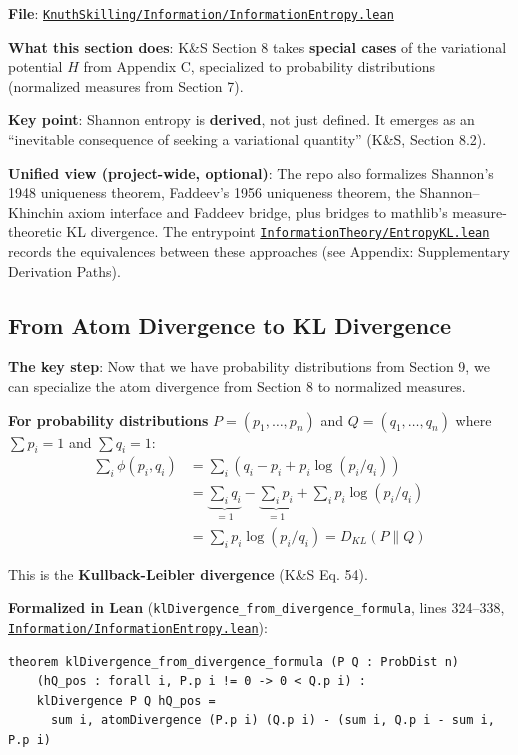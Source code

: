 \documentclass[11pt]{article}
\theoremstyle{definition}
\theoremstyle{remark}
\begin{document}
\textbf{File}: \href{https://github.com/zariuq/ks-foundations-of-inference/blob/main/KnuthSkilling/Information/InformationEntropy.lean}{\texttt{KnuthSkilling/Information/InformationEntropy.lean}}

\textbf{What this section does}: K\&S Section 8 takes \textbf{special cases} of the variational potential $H$ from Appendix C, specialized to probability distributions (normalized measures from Section 7).

\textbf{Key point}: Shannon entropy is \textbf{derived}, not just defined. It emerges as an ``inevitable consequence of seeking a variational quantity'' (K\&S, Section 8.2).

\textbf{Unified view (project-wide, optional)}: The repo also formalizes Shannon's 1948 uniqueness theorem, Faddeev's 1956 uniqueness theorem, the Shannon--Khinchin axiom interface and Faddeev bridge, plus bridges to mathlib's measure-theoretic KL divergence. The entrypoint \href{https://github.com/zariuq/ks-foundations-of-inference/blob/main/InformationTheory/EntropyKL.lean}{\texttt{InformationTheory/EntropyKL.lean}} records the equivalences between these approaches (see Appendix: Supplementary Derivation Paths).

\subsection{From Atom Divergence to KL Divergence}

\textbf{The key step}: Now that we have probability distributions from Section 9, we can specialize the atom divergence from Section 8 to normalized measures.

\textbf{For probability distributions} $P = (p_1, \ldots, p_n)$ and $Q = (q_1, \ldots, q_n)$ where $\sum p_i = 1$ and $\sum q_i = 1$:
\begin{align*}
\sum_i \phi(p_i, q_i) &= \sum_i (q_i - p_i + p_i \log(p_i/q_i)) \\
&= \underbrace{\sum_i q_i}_{=1} - \underbrace{\sum_i p_i}_{=1} + \sum_i p_i \log(p_i/q_i) \\
&= \sum_i p_i \log(p_i/q_i) = D_{KL}(P \| Q)
\end{align*}

This is the \textbf{Kullback-Leibler divergence} (K\&S Eq. 54).

\textbf{Formalized in Lean} (\texttt{klDivergence\_from\_divergence\_formula}, lines 324--338,
\href{https://github.com/zariuq/ks-foundations-of-inference/blob/main/KnuthSkilling/Information/InformationEntropy.lean}{\texttt{Information/InformationEntropy.lean}}):
\begin{lstlisting}
theorem klDivergence_from_divergence_formula (P Q : ProbDist n)
    (hQ_pos : forall i, P.p i != 0 -> 0 < Q.p i) :
    klDivergence P Q hQ_pos =
      sum i, atomDivergence (P.p i) (Q.p i) - (sum i, Q.p i - sum i, P.p i)
\end{lstlisting}
\end{document}
